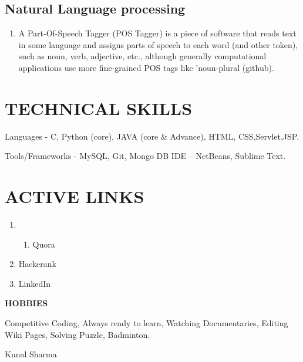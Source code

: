 \documentclass{article} %
\begin{document}
\noindent 
\subsection{Natural Language processing}

\begin{enumerate}
\item  A Part-Of-Speech Tagger (POS Tagger) is a piece of software that reads text in some language and assigns parts of speech to each word (and other token), such as noun, verb, adjective, etc., although generally computational applications use more fine-grained POS tags like 'noun-plural (github).
\end{enumerate}

\noindent 
\section{TECHNICAL SKILLS  }

\noindent Languages - C, Python (core), JAVA (core \& Advance), HTML, CSS,Servlet,JSP.

\noindent Tools/Frameworks - MySQL, Git, Mongo DB IDE -- NetBeans, Sublime Text.

\noindent 
\section{ACTIVE LINKS  }

\begin{enumerate}
\item \begin{enumerate}
\item  Quora
\end{enumerate}

\item  Hackerank

\item  LinkedIn
\end{enumerate}

\noindent \textbf{HOBBIES\underbar{  }}

\noindent Competitive Coding, Always ready to learn, Watching Documentaries, Editing Wiki Pages, Solving Puzzle, Badminton.

\noindent 

\noindent 

\noindent Kunal Sharma
\end{document}
